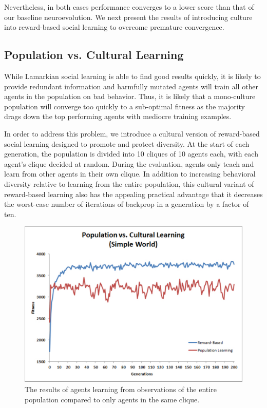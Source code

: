 \documentclass{acm_proc_article-sp}
\begin{document}
Nevertheless, in both cases performance converges to a lower score than that of our baseline neuroevolution. We next present the results of introducing culture into reward-based social learning to overcome premature convergence.

\subsection*{Population vs. Cultural Learning}
While Lamarkian social learning is able to find good results quickly, it is likely to provide redundant information and harmfully mutated agents will train all other agents in the population on bad behavior. Thus, it is likely that a mono-culture population will converge too quickly to a sub-optimal fitness as the majority drags down the top performing agents with mediocre training examples.

In order to address this problem, we introduce a cultural version of reward-based social learning designed to promote and protect diversity. At the start of each generation, the population is divided into 10 cliques of 10 agents each, with each agent's clique decided at random. During the evaluation, agents only teach and learn from other agents in their own clique. In addition to increasing behavioral diversity relative to learning from the entire population, this cultural variant of reward-based learning also has the appealing practical advantage that it decreases the worst-case number of iterations of backprop in a generation by a factor of ten.

\begin{figure}
  \centering
    \includegraphics[scale=.35]{population_vs_cultural_learning.pdf}
  \caption{The results of agents learning from observations of the entire population compared to only agents in the same clique.}
  \label{fig:population-social}
\end{figure}
\end{document}
